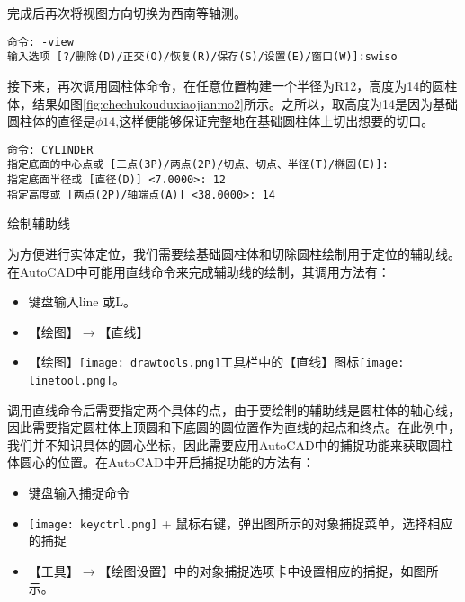 \begin{procedure}
完成后再次将视图方向切换为西南等轴测。
\begin{lstlisting}
命令: -view 
输入选项 [?/删除(D)/正交(O)/恢复(R)/保存(S)/设置(E)/窗口(W)]:swiso 
\end{lstlisting}

接下来，再次调用圆柱体命令，在任意位置构建一个半径为R12，高度为14的圆柱体，结果如图\ref{fig:chechukouduxiaojianmo2}所示。之所以，取高度为14是因为基础圆柱体的直径是$\phi 14$,这样便能够保证完整地在基础圆柱体上切出想要的切口。
\begin{lstlisting}
命令: CYLINDER
指定底面的中心点或 [三点(3P)/两点(2P)/切点、切点、半径(T)/椭圆(E)]:
指定底面半径或 [直径(D)] <7.0000>: 12
指定高度或 [两点(2P)/轴端点(A)] <38.0000>: 14
\end{lstlisting}

\item 绘制辅助线

为方便进行实体定位，我们需要绘基础圆柱体和切除圆柱绘制用于定位的辅助线。在AutoCAD中可能用直线命令来完成辅助线的绘制，其调用方法有：

\begin{itemize}
\item 键盘输入line 或L。
\item 【绘图】$\rightarrow$【直线】
\item 【绘图】\texttt{[image: drawtools.png]}工具栏中的【直线】图标\texttt{[image: linetool.png]}。
\end{itemize}

调用直线命令后需要指定两个具体的点，由于要绘制的辅助线是圆柱体的轴心线，因此需要指定圆柱体上顶圆和下底圆的圆位置作为直线的起点和终点。在此例中，我们并不知识具体的圆心坐标，因此需要应用AutoCAD中的捕捉功能来获取圆柱体圆心的位置。在AutoCAD中开启捕捉功能的方法有：

\begin{itemize}
	\item 键盘输入捕捉命令
	\item \texttt{[image: keyctrl.png]} + 鼠标右键，弹出图所示的对象捕捉菜单，选择相应的捕捉
	\item 【工具】$\rightarrow$【绘图设置】中的对象捕捉选项卡中设置相应的捕捉，如图所示。
\end{itemize}

\begin{figure}[htbp]%
\centering
\begin{floatrow}[2]
\end{floatrow}
\end{figure}


\end{procedure}
